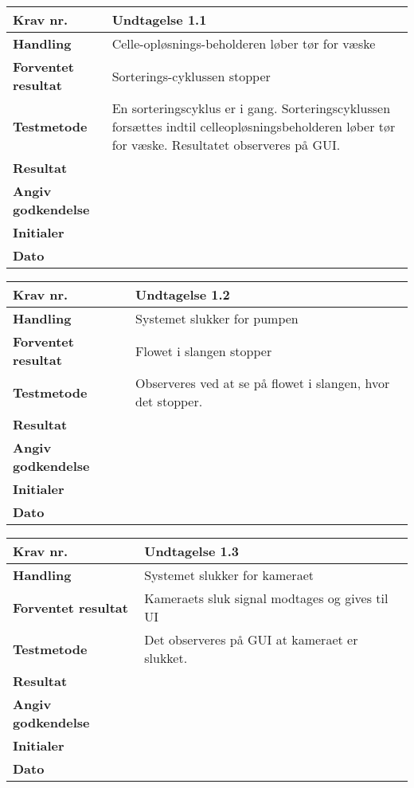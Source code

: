 \begin{center}
		\begin{longtable}{ | m{4cm}| m{8.5cm}|} 
			\hline
			\textbf{Krav nr.} & Undtagelse 1.1  \\ 
			\hline
			\textbf{Handling} & Celle-opløsnings-beholderen løber tør for væske   \\
			\hline
			\textbf{Forventet resultat} & Sorterings-cyklussen stopper \\
			\hline
			\textbf{Testmetode}  & En sorteringscyklus er i gang. Sorteringscyklussen forsættes indtil celleopløsningsbeholderen løber tør for væske. Resultatet observeres på GUI.  \\
			\hline
			\textbf{Resultat}  &    \\
			\hline
			\textbf{Angiv godkendelse} &     \\
			\hline
			\textbf{Initialer} &     \\
			\hline
			\textbf{Dato} &    \\
			\hline
		\end{longtable}
	\end{center}
			
	\begin{center}
		\begin{longtable}{ | m{4cm}| m{8.5cm}|} 
			\hline
			\textbf{Krav nr.} & Undtagelse 1.2  \\ 
			\hline
			\textbf{Handling} & Systemet slukker for pumpen   \\
			\hline
			\textbf{Forventet resultat} & Flowet i slangen stopper \\
			\hline
			\textbf{Testmetode}  & Observeres ved at se på flowet i slangen, hvor det stopper. \\
			\hline
			\textbf{Resultat}  &    \\
			\hline
			\textbf{Angiv godkendelse} &     \\
			\hline
			\textbf{Initialer} &     \\
			\hline
			\textbf{Dato} &    \\
			\hline
		\end{longtable}
	\end{center}
			
	\begin{center}
		\begin{longtable}{ | m{4cm}| m{8.5cm}|} 
			\hline
			\textbf{Krav nr.} & Undtagelse 1.3  \\ 
			\hline
			\textbf{Handling} & Systemet slukker for kameraet  \\
			\hline
			\textbf{Forventet resultat} & Kameraets sluk signal modtages og gives til UI \\
			\hline
			\textbf{Testmetode}  & Det observeres på GUI at kameraet er slukket.  \\
			\hline
			\textbf{Resultat}  &    \\
			\hline
			\textbf{Angiv godkendelse} &     \\
			\hline
			\textbf{Initialer} &     \\
			\hline
			\textbf{Dato} &    \\
			\hline
		\end{longtable}
	\end{center}
			
